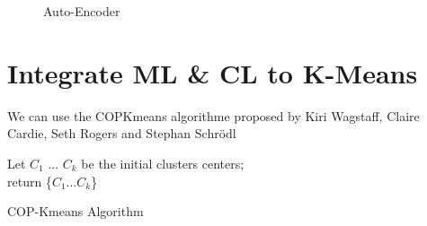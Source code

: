 \documentclass{article}
\begin{document}
\begin{figure}[!t]
  \centering
  
  \caption{Auto-Encoder}
  \label{fig:final_archi}
\end{figure}
\section{Integrate ML \& CL to K-Means}

We can use the COPKmeans algorithme proposed by Kiri Wagstaff, Claire
Cardie, Seth Rogers and Stephan Schr\"odl
\cite{Wagstaff:2001:CKC:645530.655669} 

\begin{algorithm}[H]
  Let $C_1$ ... $C_k$ be the initial clusters centers;\\
  return \{$C_1$...$C_k$\}
 \caption{COP-Kmeans Algorithm}
\end{algorithm} 
\nocite{*}
\printbibliography[title=References]
\end{document}
